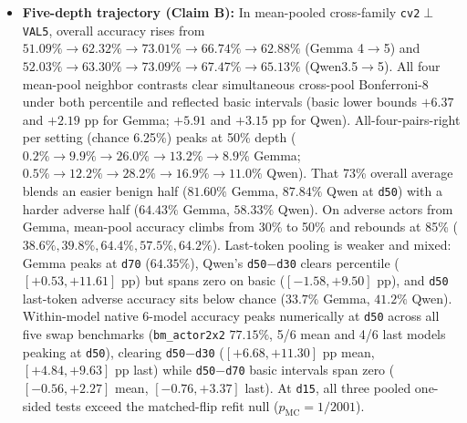 \documentclass[conference]{IEEEtran}
\begin{document}
\begin{itemize}
  \item \textbf{Five-depth trajectory (Claim B):} In mean-pooled cross-family \texttt{cv2}$\perp$\texttt{VAL5}, overall accuracy rises from $51.09\% \to 62.32\% \to \mathbf{73.01\%} \to 66.74\% \to 62.88\%$ (Gemma 4$\to$5) and $52.03\% \to 63.30\% \to \mathbf{73.09\%} \to 67.47\% \to 65.13\%$ (Qwen3.5$\to$5). All four mean-pool neighbor contrasts clear simultaneous cross-pool Bonferroni-8 under both percentile and reflected basic intervals (basic lower bounds $+6.37$ and $+2.19$ pp for Gemma; $+5.91$ and $+3.15$ pp for Qwen). All-four-pairs-right per setting (chance 6.25\%) peaks at 50\% depth ($0.2\% \to 9.9\% \to \mathbf{26.0\%} \to 13.2\% \to 8.9\%$ Gemma; $0.5\% \to 12.2\% \to \mathbf{28.2\%} \to 16.9\% \to 11.0\%$ Qwen). That 73\% overall average blends an easier benign half ($81.60\%$ Gemma, $87.84\%$ Qwen at \texttt{d50}) with a harder adverse half ($64.43\%$ Gemma, $58.33\%$ Qwen). On adverse actors from Gemma, mean-pool accuracy climbs from 30\% to 50\% and rebounds at 85\% ($38.6\%, 39.8\%, 64.4\%, 57.5\%, 64.2\%$). Last-token pooling is weaker and mixed: Gemma peaks at \texttt{d70} ($64.35\%$), Qwen's \texttt{d50}$-$\texttt{d30} clears percentile ($[+0.53,+11.61]$ pp) but spans zero on basic ($[-1.58,+9.50]$ pp), and \texttt{d50} last-token adverse accuracy sits below chance ($33.7\%$ Gemma, $41.2\%$ Qwen). Within-model native 6-model accuracy peaks numerically at \texttt{d50} across all five swap benchmarks (\texttt{bm\_actor2x2} $77.15\%$, 5/6 mean and 4/6 last models peaking at \texttt{d50}), clearing \texttt{d50}$-$\texttt{d30} ($[+6.68,+11.30]$ pp mean, $[+4.84,+9.63]$ pp last) while \texttt{d50}$-$\texttt{d70} basic intervals span zero ($[-0.56,+2.27]$ mean, $[-0.76,+3.37]$ last). At \texttt{d15}, all three pooled one-sided tests exceed the matched-flip refit null ($p_{\text{MC}}=1/2001$).

\end{itemize}
\end{document}
